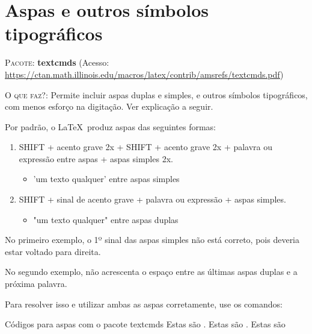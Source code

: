 \documentclass[a4paper,12pt,oneside,openright,extrafontsizes,openbib]{memoir}
\begin{document}
{\begin{center}
\end{center}


\chapter{Aspas e outros símbolos tipográficos}

\textsc{Pacote:} \textbf{textcmds} (Acesso: \url{https://ctan.math.illinois.edu/macros/latex/contrib/amsrefs/textcmds.pdf})

\textsc{O que faz?}: Permite incluir aspas duplas e simples, e outros símbolos tipográficos, com menos esforço na digitação. Ver explicação a seguir.

Por padrão, o \LaTeX\ produz aspas das seguintes formas:

\begin{enumerate}
	\item SHIFT + acento grave 2x + SHIFT + acento grave 2x + palavra ou expressão entre aspas + aspas simples 2x.
	\begin{itemize}
		\item 'um texto qualquer' entre aspas simples
	\end{itemize}
	\item SHIFT + sinal de acento grave + palavra ou expressão + aspas simples.
	\begin{itemize}
		\item "um texto qualquer" entre aspas duplas
	\end{itemize}
\end{enumerate}

No primeiro exemplo, o 1º sinal das aspas simples não está correto, pois deveria estar voltado para direita.

No segundo exemplo, não acrescenta o espaço entre as últimas aspas duplas e a próxima palavra.

Para resolver isso e utilizar ambas as aspas corretamente, use os comandos:

\begin{codex}{Códigos para aspas com o pacote textcmds}
	Estas são .
	Estas são .
	Estas são 
\end{codex}

}
\end{document}
